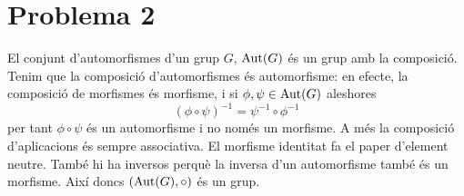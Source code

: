 \documentclass[12pt]{article}
\begin{document}

\section*{Problema 2}
El conjunt d'automorfismes d'un grup \( G \), \( \operatorname{Aut}(G) \) és un grup amb la composició.
Tenim que la composició d'automorfismes és automorfisme: en efecte, la composició de
morfismes és morfisme, i si \( \phi, \psi \in \operatorname{Aut}(G) \) aleshores
\begin{equation*}
	(\phi \circ \psi)^{-1} = \psi^{-1} \circ \phi^{-1} 
\end{equation*}
per tant \( \phi \circ \psi \) és un automorfisme i no només un morfisme. A més la
composició d'aplicacions és sempre associativa. El morfisme identitat fa el paper
d'element neutre. També hi ha inversos perquè la inversa d'un automorfisme també és un
morfisme. Així doncs \( (\operatorname{Aut}(G), \circ) \) és un grup. 

\parbreak
\end{document}
